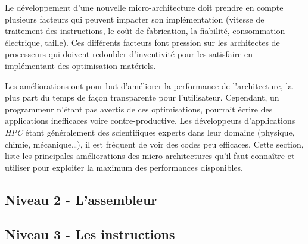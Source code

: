 Le développement d'une nouvelle micro-architecture doit prendre en compte plusieurs facteurs qui peuvent impacter son implémentation (vitesse de traitement des instructions, le coût de fabrication, la fiabilité, consommation électrique, taille). Ces différents facteurs font pression sur les architectes de processeurs qui doivent redoubler d'inventivité pour les satisfaire en implémentant des optimisation matériels.

Les améliorations ont pour but d’améliorer la performance de l’architecture, la plus part du temps de façon transparente pour l’utilisateur. Cependant, un programmeur n’étant pas avertis de ces optimisations, pourrait écrire des applications inefficaces voire contre-productive. Les développeurs d’applications \textit{HPC} étant généralement des scientifiques experts dans leur domaine (physique, chimie, mécanique…), il est fréquent de voir des codes peu efficaces. Cette section, liste les principales améliorations des micro-architectures qu'il faut connaître et utiliser pour exploiter la maximum des performances disponibles. 


































\subsection{Niveau 2 - L'assembleur}





\subsection{Niveau 3 - Les instructions}






